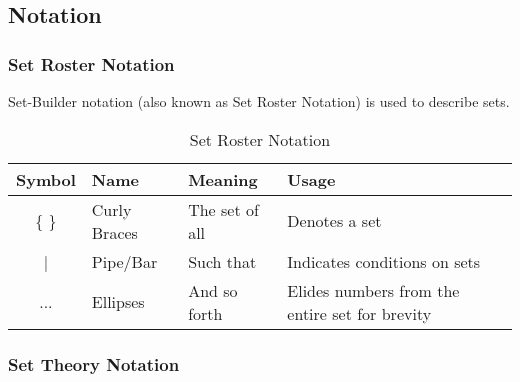 \documentclass[11pt]{article}
\begin{document}
\subsection{Notation}

\subsubsection{Set Roster Notation}

Set-Builder notation (also known as Set Roster Notation) is used to describe sets.

\begin{table}[!htbp]
    \centering
    \caption{Set Roster Notation}
    \begin{tabular}{ c l l l }
        \toprule
        Symbol  & Name          & Meaning           & Usage \\
        \midrule
        \{ \}   & Curly Braces  & The set of all    & Denotes a set \\
        |       & Pipe/Bar      & Such that         & Indicates conditions on sets \\
        ...     & Ellipses      & And so forth      & Elides numbers from the entire set for brevity \\
        \bottomrule
    \end{tabular}
    \label{tab:tbl-set-notation}
\end{table}

\subsubsection{Set Theory Notation}
\end{document}
